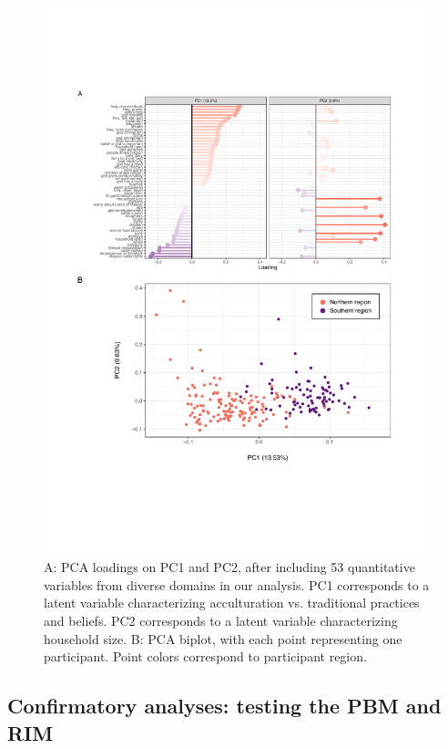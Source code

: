 \documentclass[
  11pt,
]{article}
\begin{document}
\begin{figure}[H]

{\centering \includegraphics[width=0.9\linewidth]{images/figure2-maintext} 

}

\caption{A: PCA loadings on PC1 and PC2, after including 53 quantitative variables from diverse domains in our analysis. PC1 corresponds to a latent variable characterizing acculturation vs. traditional practices and beliefs. PC2 corresponds to a latent variable characterizing household size. B: PCA biplot, with each point representing one participant. Point colors correspond to participant region.}\label{fig:pcaplot}
\end{figure}

\hypertarget{confirmatory-analyses-testing-the-pbm-and-rim}{%
\subsection{Confirmatory analyses: testing the PBM and
RIM}\label{confirmatory-analyses-testing-the-pbm-and-rim}}
\end{document}
